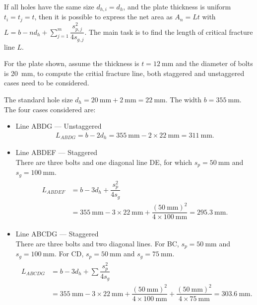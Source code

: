 If all holes have the same size $d_{h,i}=d_h$, and the plate thickness is uniform $t_i=t_j=t$, then it is possible to express the net area as $A_n=Lt$ with $L=b-nd_h+\sum_{j=1}^{m}\dfrac{s_{p,j}^2}{4s_{g,j}}$. The main task is to find the length of critical fracture line $L$.

\begin{exmp}
For the plate shown, assume the thickness is $t=\SI{12}{\mm}$ and the diameter of bolts is \SI{20}{\mm}, to compute the critial fracture line, both staggered and unstaggered cases need to be considered.
\begin{figure}[H]\centering

\end{figure}
\end{exmp}
\begin{solution}
The standard hole size $d_h=\SI{20}{\mm}+\SI{2}{\mm}=\SI{22}{\mm}$. The width $b=\SI{355}{\mm}$. The four cases considered are:
\begin{itemize}
\item Line ABDG --- Unstaggered
\begin{gather*}
L_{ABDG}=b-2d_h=\SI{355}{\mm}-2\times\SI{22}{\mm}=\SI{311}{\mm}.
\end{gather*}
\item Line ABDEF --- Staggered\\
There are three bolts and one diagonal line DE, for which $s_p=\SI{50}{\mm}$ and $s_g=\SI{100}{\mm}$.
\begin{gather*}
\begin{split}
L_{ABDEF}&=b-3d_h+\dfrac{s_p^2}{4s_g}\\&=\SI{355}{\mm}-3\times\SI{22}{\mm}+\dfrac{\left(\SI{50}{\mm}\right)^2}{4\times\SI{100}{\mm}}=\SI{295.3}{\mm}.
\end{split}
\end{gather*}
\item Line ABCDG --- Staggered\\
There are three bolts and two diagonal lines. For BC, $s_p=\SI{50}{\mm}$ and $s_g=\SI{100}{\mm}$. For CD, $s_p=\SI{50}{\mm}$ and $s_g=\SI{75}{\mm}$.
\begin{gather*}
\begin{split}
L_{ABCDG}&=b-3d_h+\sum\dfrac{s_p^2}{4s_g}\\&=\SI{355}{\mm}-3\times\SI{22}{\mm}+\dfrac{\left(\SI{50}{\mm}\right)^2}{4\times\SI{100}{\mm}}+\dfrac{\left(\SI{50}{\mm}\right)^2}{4\times\SI{75}{\mm}}=\SI{303.6}{\mm}.
\end{split}
\end{gather*}

\end{itemize}
\end{solution}
